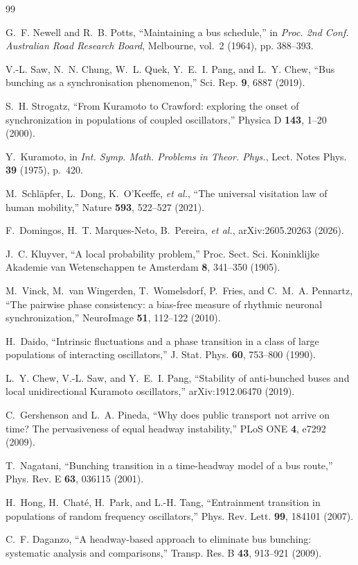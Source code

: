 \documentclass[9pt,twocolumn,twoside]{opticajnl}
\begin{document}
\begin{thebibliography}{99}

 G.~F. Newell and R.~B. Potts, ``Maintaining a bus schedule,'' in
\emph{Proc. 2nd Conf. Australian Road Research Board}, Melbourne, vol.~2 (1964), pp. 388--393.

 V.-L. Saw, N.~N. Chung, W.~L. Quek, Y.~E.~I. Pang, and L.~Y. Chew,
``Bus bunching as a synchronisation phenomenon,'' Sci. Rep. \textbf{9}, 6887 (2019).

 S.~H. Strogatz, ``From Kuramoto to Crawford: exploring the onset of
synchronization in populations of coupled oscillators,'' Physica D \textbf{143}, 1--20 (2000).

 Y.~Kuramoto, in \emph{Int. Symp. Math. Problems in Theor. Phys.},
Lect. Notes Phys. \textbf{39} (1975), p.~420.

 M.~Schl\"apfer, L.~Dong, K.~O'Keeffe, \emph{et al.},
``The universal visitation law of human mobility,'' Nature \textbf{593}, 522--527 (2021).

 F.~Domingos, H.~T. Marques-Neto, B.~Pereira, \emph{et al.},
arXiv:2605.20263 (2026).

 J.~C. Kluyver, ``A local probability problem,'' Proc. Sect. Sci.
Koninklijke Akademie van Wetenschappen te Amsterdam \textbf{8}, 341--350 (1905).

 M.~Vinck, M.~van Wingerden, T.~Womelsdorf, P.~Fries, and C.~M.~A. Pennartz,
``The pairwise phase consistency: a bias-free measure of rhythmic neuronal synchronization,''
NeuroImage \textbf{51}, 112--122 (2010).

 H.~Daido, ``Intrinsic fluctuations and a phase transition in a class of large
populations of interacting oscillators,'' J. Stat. Phys. \textbf{60}, 753--800 (1990).

 L.~Y. Chew, V.-L. Saw, and Y.~E.~I. Pang, ``Stability of anti-bunched buses and
local unidirectional Kuramoto oscillators,'' arXiv:1912.06470 (2019).

 C.~Gershenson and L.~A. Pineda, ``Why does public transport not arrive on
time? The pervasiveness of equal headway instability,'' PLoS ONE \textbf{4}, e7292 (2009).

 T.~Nagatani, ``Bunching transition in a time-headway model of a bus
route,'' Phys. Rev. E \textbf{63}, 036115 (2001).

 H.~Hong, H.~Chat\'e, H.~Park, and L.-H. Tang, ``Entrainment transition in
populations of random frequency oscillators,'' Phys. Rev. Lett. \textbf{99}, 184101 (2007).

 C.~F. Daganzo, ``A headway-based approach to eliminate bus bunching:
systematic analysis and comparisons,'' Transp. Res. B \textbf{43}, 913--921 (2009).

\end{thebibliography}
\end{document}
